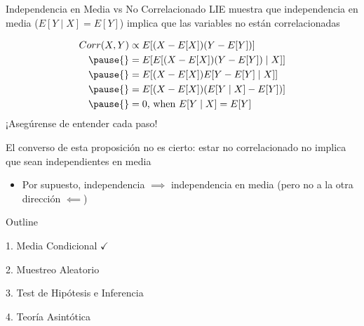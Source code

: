 \documentclass[11pt,handout,aspectratio=169]{beamer}
\begin{document}
\begin{frame}{Independencia en Media vs No Correlacionado}
\vspace{0.2cm}
LIE muestra que independencia en media ($E[Y\mid X]=E[Y]$) implica que las variables no están correlacionadas

\begin{align*}
Corr(X,Y)&\propto E[(X-E[X])(Y-E[Y])]\\ \pause{}
&=E[E[(X-E[X])(Y-E[Y])\mid X]]\\ \pause{}
&= E[(X-E[X])E[Y-E[Y]\mid X]]\\\pause{}
&= E[(X-E[X])(E[Y\mid X]-E[Y])]\\\pause{}
&= 0\text{, when $E[Y\mid X]=E[Y]$}
\end{align*}
\vspace{0.3cm}
¡Asegúrense de entender cada paso!
\vspace{0.5cm}

El converso de esta proposición no es cierto: estar no correlacionado no implica que sean independientes en media

\begin{itemize}
\item Por supuesto, independencia $\implies$ independencia en media (pero no a la otra dirección $\impliedby$)
\end{itemize}

\end{frame}
	
\begin{frame}{Outline}
	
	\textcolor{red!75!green!50!blue!25!gray}{1. Media Condicional} $\checkmark$
	\vspace{0.8cm}
	
	
	2. Muestreo Aleatorio
	
	\vspace{0.8cm}
	3. Test de Hipótesis e Inferencia
	
	\vspace{0.8cm}
	4. Teoría Asintótica		
\end{frame}
\end{document}
